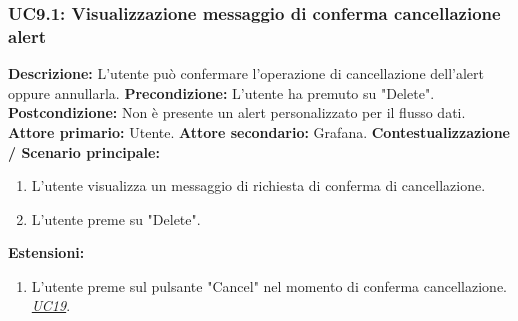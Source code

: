                 \subsubsection{UC9.1: Visualizzazione messaggio di conferma cancellazione alert}
                    \textbf{Descrizione:}  L’utente può confermare l'operazione di cancellazione dell'alert oppure annullarla.
                    \newline
                    \textbf{Precondizione:} L'utente ha premuto su "Delete".
                    \newline
                    \textbf{Postcondizione:} Non è presente un alert personalizzato per il flusso dati.
                    \newline
                    \textbf{Attore primario:} Utente.
                    \newline
                    \textbf{Attore secondario:} Grafana.
                    \newline
                    \textbf{Contestualizzazione / Scenario principale:} \begin{enumerate}
                            \item L'utente visualizza un messaggio di richiesta di conferma di cancellazione.
                            \item L'utente preme su "Delete".
                        \end{enumerate}
                \textbf{Estensioni:} 
                    \begin{enumerate}
                            \item L'utente preme sul pulsante "Cancel" nel momento di conferma cancellazione. \underline{\textit{UC19}}.
                        \end{enumerate}
                        
